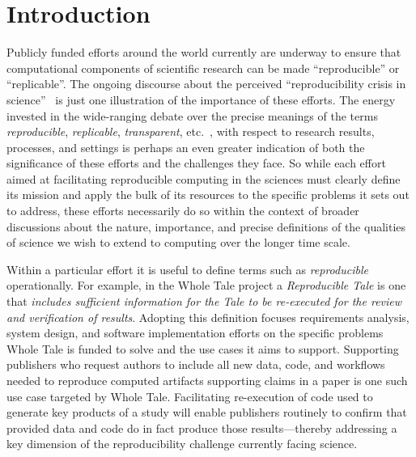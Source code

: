 
\section{Introduction}

Publicly funded efforts around the world currently are underway to
	ensure that computational components of scientific research
	can be made ``reproducible'' or ``replicable''.
The ongoing discourse about the perceived ``reproducibility crisis in science''~\cite{donoho_reproducible_2009,baker_2016,fanelli_opinion:_2018}
	is just one illustration of the importance of these efforts.
The energy invested in the wide-ranging debate over the precise meanings of the
	terms \emph{reproducible}, \emph{replicable},
        \emph{transparent}, etc.\
        \cite{drummond2009replicability,carolegoble2016what,freire2016reproducibilitya,goodman2016what,ioannidis2017reproducibility,herouxtoward,plesser2018reproducibility,barba2018terminologies,committeeonreproducibilityandreplicabilityinscience2019reproducibility}, with
	respect to research results, processes, and settings is perhaps an even greater indication of
	both the significance of these efforts and the challenges they face.
So while each effort aimed at facilitating reproducible computing in the
	sciences must clearly define its mission and apply the bulk of its resources
	to the specific problems it sets out to address, these efforts necessarily do
	so within the context of broader discussions about the nature, importance,
	and precise definitions of the qualities of science we wish to extend to computing
	over the longer time scale.

Within a particular effort it is useful to define terms such as \emph{reproducible} operationally.
For example, in the Whole Tale project \cite{WT2019,brinckman2019computing} a \emph{Reproducible Tale} is one
	that \emph{includes sufficient information for the Tale to be re-executed for the review
	and verification of results}.
Adopting this definition focuses requirements analysis, system design,
	and software implementation efforts on the specific problems Whole Tale is funded to solve
	and the use cases it aims to support.
Supporting publishers who request authors to include all new data,
	code, and workflows needed to reproduce computed artifacts supporting
	claims in a paper is one such use case targeted by Whole Tale.
Facilitating re-execution of code used to generate
	key products of a study will enable publishers routinely to confirm that
	provided data and code do in fact produce those results---thereby addressing
	a key dimension of the reproducibility challenge currently facing science.

